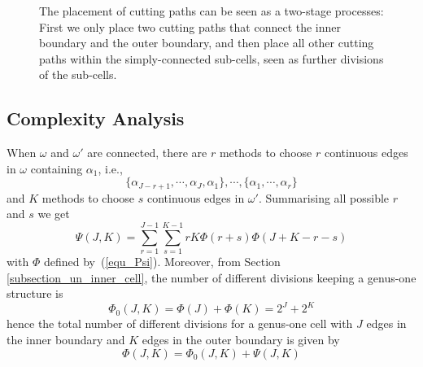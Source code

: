\documentclass[journal]{IEEEtran}
\begin{document}
\begin{figure}[t]
\centering
{}
\caption{The placement of cutting paths can be seen as a two-stage processes: First we only place two cutting paths that connect the inner boundary and the outer boundary, and then place all other cutting paths within the simply-connected sub-cells, seen as further divisions of the sub-cells.}
\label{fig_equivalence}
\end{figure}

\subsection{Complexity Analysis}\label{subsection_genus_one_complexity}
When $\omega$ and $\omega'$ are connected, there are $r$ methods to choose $r$ continuous edges in $\omega$ containing $\alpha_1$, i.e., 
\begin{equation}
\{\alpha_{J-r+1}, \cdots, \alpha_J, \alpha_1\}, \cdots, \{\alpha_1, \cdots, \alpha_r\}
\end{equation}
and $K$ methods to choose $s$ continuous edges in $\omega'$. Summarising all possible $r$ and $s$ we get
\begin{equation}\label{equ_Psi_1}
\Psi(J, K) = \sum\limits_{r = 1}^{J-1}\sum\limits_{s = 1}^{K-1} rK\Phi(r+s)\Phi(J+K -r-s)
\end{equation}
with $\Phi$ defined by~(\ref{equ_Psi}). Moreover, from Section \ref{subsection_un_inner_cell}, the number of different divisions keeping a genus-one structure is 
\begin{equation}\label{equ_Phi_0}
\Phi_0(J, K) = \Phi(J) + \Phi(K) = 2^J + 2^K
\end{equation}
hence the total number of different divisions for a genus-one cell with $J$ edges in the inner boundary and $K$ edges in the outer boundary is given by
\begin{equation}
\Phi(J, K) = \Phi_0(J, K) + \Psi(J, K)
\end{equation}
\end{document}
